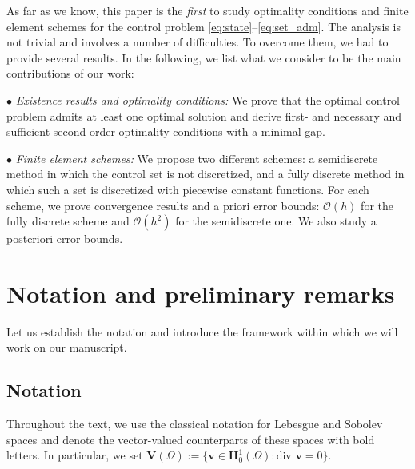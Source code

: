 \documentclass[final]{siamart0216}
\begin{document}
As far as we know, this paper is the \emph{first} to study optimality conditions and finite element schemes for the control problem \eqref{eq:state}--\eqref{eq:set_adm}. The analysis is not trivial and involves a number of difficulties. To overcome them, we had to provide several results. In the following, we list what we consider to be the main contributions of our work:

$\bullet$ \emph{Existence results and optimality conditions:} We prove that the optimal control problem admits at least one optimal solution and derive first- and necessary and sufficient second-order optimality conditions with a minimal gap.

$\bullet$ \emph{Finite element schemes:} We propose two different schemes: a semidiscrete method in which the control set is not discretized, and a fully discrete method in which such a set is discretized with piecewise constant functions. For each scheme, we prove convergence results and a priori error bounds: $\mathcal{O}(h)$ for the fully discrete scheme and $\mathcal{O}(h^2)$ for the semidiscrete one. We also study a posteriori error bounds.


\section{Notation and preliminary remarks}
\label{sec:notation}
Let us establish the notation and introduce the framework within which we will work on our manuscript.


\subsection{Notation}
Throughout the text, we use the classical notation for Lebesgue and Sobolev spaces and denote the vector-valued counterparts of these spaces with bold letters. In particular, we set
$
\mathbf{V}(\Omega):=\{\mathbf{v}\in\mathbf{H}_0^1(\Omega):\text{div }\mathbf{v}=0\}.
$
\end{document}

